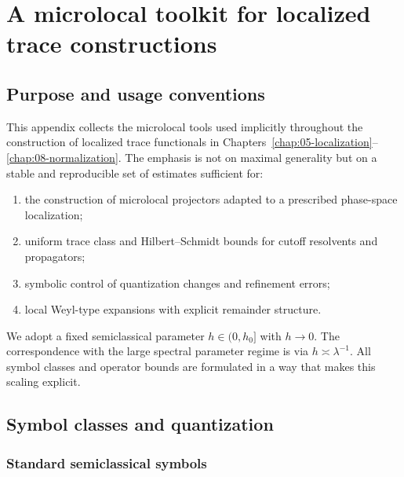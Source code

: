 
\appendix
\chapter{A microlocal toolkit for localized trace constructions}
\label{app:C-microlocal-toolkit}

\section{Purpose and usage conventions}
\label{sec:C.purpose}

This appendix collects the microlocal tools used implicitly throughout the construction of localized trace
functionals in Chapters~\ref{chap:05-localization}--\ref{chap:08-normalization}.
The emphasis is not on maximal generality but on a stable and reproducible set of estimates sufficient for:

\begin{enumerate}
\item the construction of microlocal projectors adapted to a prescribed phase-space localization;
\item uniform trace class and Hilbert--Schmidt bounds for cutoff resolvents and propagators;
\item symbolic control of quantization changes and refinement errors;
\item local Weyl-type expansions with explicit remainder structure.
\end{enumerate}

We adopt a fixed semiclassical parameter $h\in(0,h_0]$ with $h\to 0$.
The correspondence with the large spectral parameter regime is via $h\asymp \lambda^{-1}$.
All symbol classes and operator bounds are formulated in a way that makes this scaling explicit.

\section{Symbol classes and quantization}
\label{sec:C.symbols}

\subsection{Standard semiclassical symbols}
\label{subsec:C.symbols.standard}

